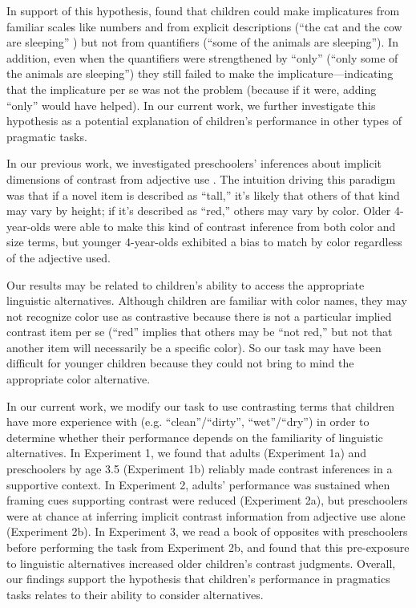 \documentclass[10pt,letterpaper]{article}
\begin{document}
In support of this hypothesis,  found that children could make implicatures from familiar scales like numbers and from explicit descriptions (``the cat and the cow are sleeping'' ) but not from quantifiers (``some of the animals are sleeping''). In addition, even when the quantifiers were strengthened by ``only'' (``only some of the animals are sleeping'') they still failed to make the implicature---indicating that the implicature per se was not the problem (because if it were, adding ``only'' would have helped). In our current work, we further investigate this hypothesis as a potential explanation of children's performance in other types of pragmatic tasks.  

In our previous work, we investigated preschoolers' inferences about implicit dimensions of contrast from adjective use \cite{horowitz2012}. The intuition driving this paradigm was that if a novel item is described as ``tall,'' it's likely that others of that kind may vary by height; if it's described as ``red,'' others may vary by color. Older 4-year-olds were able to make this kind of contrast inference from both color and size terms, but younger 4-year-olds exhibited a bias to match by color regardless of the adjective used.  

Our results may be related to children's ability to access the appropriate linguistic alternatives. Although children are familiar with color names, they may not recognize color use as contrastive because there is not a particular implied contrast item per se (``red'' implies that others may be ``not red,'' but not that another item will necessarily be a specific color). So our task may have been difficult for younger children because they could not bring to mind the appropriate color alternative. 

In our current work, we modify our task to use contrasting terms that children have more experience with (e.g. ``clean''/``dirty'', ``wet''/``dry'') in order to determine whether their performance depends on the familiarity of linguistic alternatives. In Experiment 1, we found that adults (Experiment 1a) and preschoolers by age 3.5 (Experiment 1b) reliably made contrast inferences in a supportive context.  In Experiment 2, adults' performance was sustained when framing cues supporting contrast were reduced (Experiment 2a), but preschoolers were at chance at inferring implicit contrast information from adjective use alone (Experiment 2b).  In Experiment 3, we read a book of opposites with preschoolers before performing the task from Experiment 2b, and found that this pre-exposure to linguistic alternatives increased older children's contrast judgments.  Overall, our findings support the hypothesis that children's performance in pragmatics tasks relates to their ability to consider alternatives.
\end{document}
